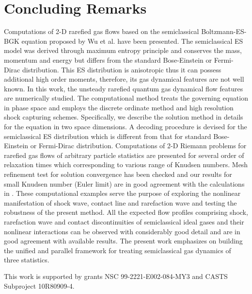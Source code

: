 \documentclass[twoside,twocolumn,prc,floats,amsmath,amssymb]{revtex4} %
\begin{document}
\section{Concluding Remarks}
Computations of 2-D rarefied gas flows based on the semiclassical Boltzmann-ES-BGK equation proposed by Wu et al. \cite{Wu2012} have been presented.  The semiclassical ES model was derived through maximum entropy principle and conserves the mass, momentum and energy but differs from the standard Bose-Einstein or Fermi-Dirac distribution. This ES distribution is anisotropic thus it can possess additional high order moments, therefore, its gas dynamical features are not well known. In this work, the unsteady rarefied quantum gas dynamical flow features are numerically studied.  The computational method treats the governing equation in phase space and employs the discrete ordinate method and high resolution shock capturing schemes. Specifically, we describe the solution method in details for the equation in two space dimensions.   A decoding procedure is devised for the semiclassical ES distribution which is different from that for standard Bose-Einstein or Fermi-Dirac distribution.  Computations of 2-D Riemann problems for rarefied gas flows of arbitrary particle statistics are presented for several order of relaxation times which corresponding to various range of Knudsen numbers.  Mesh refinement test for solution convergence has been checked and our results for small Knudsen number (Euler limit) are in good agreement with the calculations in \cite{Laxliu95}\cite{schultzrinne}.    These computational examples serve the purpose of exploring the nonlinear manifestation of shock wave, contact line and rarefaction wave and testing the robustness of the present method. All the expected flow profiles comprising shock, rarefaction wave and contact discontinuities of semiclassical ideal gases and their nonlinear interactions can be observed with considerably good detail and are in good agreement with available results. The present work emphasizes on building the unified and parallel framework for treating semiclassical gas dynamics of three statistics. 

This work is supported by grants NSC 99-2221-E002-084-MY3 and CASTS Subproject 10R80909-4.
\end{document}
